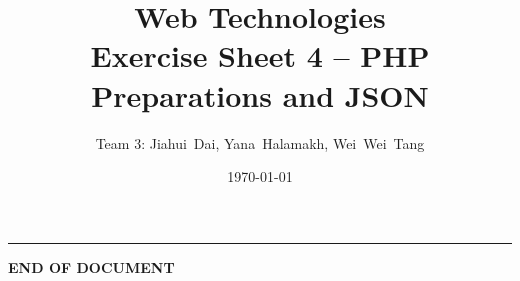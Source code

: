 \documentclass[a4paper,12pt]{article} %
\title{Web Technologies \\
        \large{Exercise Sheet 4 -- PHP Preparations and JSON}} %
\author{Team 3: Jiahui~Dai, Yana~Halamakh, Wei~Wei~Tang} %
\date{\today} %
\begin{document}
\maketitle %
\hrule %
\tableofcontents %
\newpage












\begin{center}
    \vspace{5em}
    \textbf{END OF DOCUMENT}
\end{center}
\end{document}
